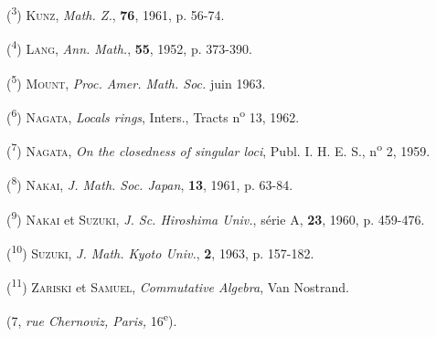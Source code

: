 (\textsuperscript{3}) \textsc{Kunz}, \textit{Math. Z.}, \textbf{76}, 1961, p. 56-74.

(\textsuperscript{4}) \textsc{Lang}, \textit{Ann. Math.}, \textbf{55}, 1952, p. 373-390.

(\textsuperscript{5}) \textsc{Mount}, \textit{Proc. Amer. Math. Soc.} juin 1963.

(\textsuperscript{6}) \textsc{Nagata}, \textit{Locals rings}, Inters., Tracts n\textsuperscript{o} 13, 1962.

(\textsuperscript{7}) \textsc{Nagata}, \textit{On the closedness of singular loci}, Publ. I. H. E. S., n\textsuperscript{o} 2, 1959.

(\textsuperscript{8}) \textsc{Nakai}, \textit{J. Math. Soc. Japan}, \textbf{13}, 1961, p. 63-84.

(\textsuperscript{9}) \textsc{Nakai} et \textsc{Suzuki}, \textit{J. Sc. Hiroshima Univ.}, série A, \textbf{23}, 1960, p. 459-476.

(\textsuperscript{10}) \textsc{Suzuki}, \textit{J. Math. Kyoto Univ.}, \textbf{2}, 1963, p. 157-182.

(\textsuperscript{11}) \textsc{Zariski} et \textsc{Samuel}, \textit{Commutative Algebra}, Van Nostrand.

\hfill(7, \textit{rue Chernoviz, Paris,} 16\textsuperscript{e}).
